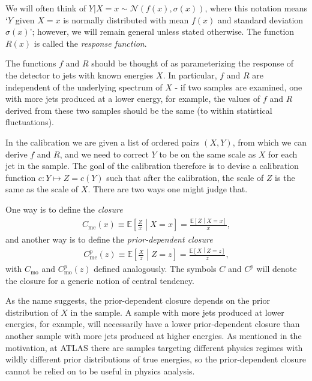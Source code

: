We will often think of $Y|X=x\sim \mathcal{N}(f(x),\sigma(x))$, where this notation means `$Y$ given $X=x$ is normally distributed with mean $f(x)$ and standard deviation $\sigma(x)$'; however, we will remain general unless stated otherwise.  The function $R(x)$ is called the {\it response function}.

The functions $f$ and $R$ should be thought of as parameterizing the response of the detector to jets with known energies $X$.
In particular, $f$ and $R$ are independent of the underlying spectrum of $X$ - if two samples are examined, one with more jets produced at a lower energy, for example, the values of $f$ and $R$ derived from these two samples should be the same (to within statistical fluctuations).

In the calibration we are given a list of ordered pairs $(X,Y)$, from which we can derive $f$ and $R$, and we need to correct $Y$ to be on the same scale as $X$ for each jet in the sample.
The goal of the calibration therefore is to devise a calibration function $c: Y\mapsto Z=c(Y)$ such that after the calibration, the scale of $Z$ is the same as the scale of $X$.
There are two ways one might judge that.

One way is to define the \textit{closure}
\begin{align}
  C_\text{me}(x) \equiv \mathbb{E}\left[\frac{Z}{x}\middle| X=x\right] = \frac{\mathbb{E}\left[Z\middle| X=x\right]}{x}
\label{eqn:NI:closure},
\end{align}
and another way is to define the \textit{prior-dependent closure}
\begin{align}
  C^p_\text{me}(z) \equiv \mathbb{E}\left[\frac{X}{z}\middle| Z=z\right] = \frac{\mathbb{E}\left[X\middle| Z=z\right]}{z}
\label{eqn:NI:closure_priordependent},
\end{align}
with $C_\text{mo}$ and $C^p_\text{mo}(z)$ defined analogously.
The symbols $C$ and $C^p$ will denote the closure for a generic notion of central tendency.

As the name suggests, the prior-dependent closure depends on the prior distribution of $X$ in the sample.
A sample with more jets produced at lower energies, for example, will necessarily have a lower prior-dependent closure than another sample with more jets produced at higher energies.
As mentioned in the motivation, at ATLAS there are samples targeting different physics regimes with wildly different prior distributions of true energies, so the prior-dependent closure cannot be relied on to be useful in physics analysis.

